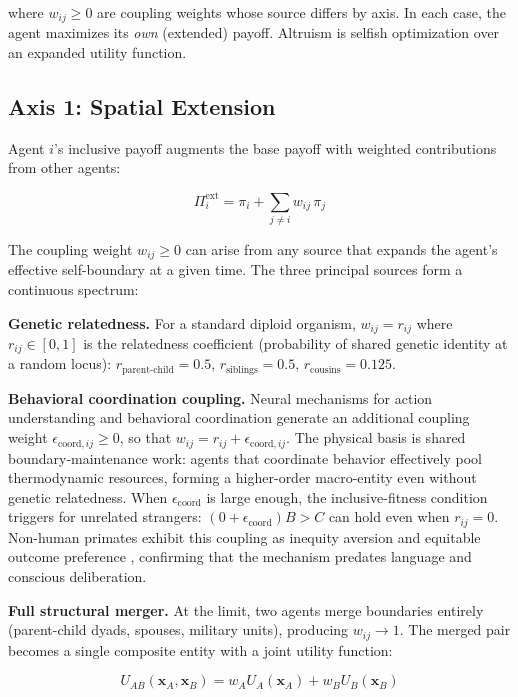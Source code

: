 \documentclass[11pt]{article}
\theoremstyle{plain}
\theoremstyle{definition}
\theoremstyle{remark}
\let\origsubsection\subsection
\renewcommand{\subsection}{\needspace{7\baselineskip}\origsubsection}
\begin{document}
where \(w_{ij} \geq 0\) are coupling weights whose source differs by
axis. In each case, the agent maximizes its \emph{own} (extended)
payoff. Altruism is selfish optimization over an expanded utility
function.

\subsection{Axis 1: Spatial Extension}\label{axis-1-spatial-extension}

Agent \(i\)'s inclusive payoff augments the base payoff with weighted
contributions from other agents:

\[\Pi_i^{\text{ext}} = \pi_i + \sum_{j \neq i} w_{ij} \, \pi_j\]

The coupling weight \(w_{ij} \geq 0\) can arise from any source that
expands the agent's effective self-boundary at a given time. The three
principal sources form a continuous spectrum:

\textbf{Genetic relatedness.} For a standard diploid organism,
\(w_{ij} = r_{ij}\) where \(r_{ij} \in [0, 1]\) is the relatedness
coefficient (probability of shared genetic identity at a random locus):
\(r_{\text{parent-child}} = 0.5\), \(r_{\text{siblings}} = 0.5\),
\(r_{\text{cousins}} = 0.125\).

\textbf{Behavioral coordination coupling.} Neural mechanisms for action
understanding and behavioral coordination
\citep{Rizzolatti2004, deWaal2008} generate an additional coupling
weight \(\epsilon_{\text{coord},ij} \geq 0\), so that
\(w_{ij} = r_{ij} + \epsilon_{\text{coord},ij}\). The physical basis is
shared boundary-maintenance work: agents that coordinate behavior
effectively pool thermodynamic resources, forming a higher-order
macro-entity even without genetic relatedness. When
\(\epsilon_{\text{coord}}\) is large enough, the inclusive-fitness
condition triggers for unrelated strangers:
\((0 + \epsilon_{\text{coord}}) B > C\) can hold even when
\(r_{ij} = 0\). Non-human primates exhibit this coupling as inequity
aversion \citep{BrosnanDeWaal2003} and equitable outcome preference
\citep{ProctorEtAl2013}, confirming that the mechanism predates language
and conscious deliberation.

\textbf{Full structural merger.} At the limit, two agents merge
boundaries entirely (parent-child dyads, spouses, military units),
producing \(w_{ij} \to 1\). The merged pair becomes a single composite
entity with a joint utility function:

\[U_{AB}(\mathbf{x}_A, \mathbf{x}_B) = w_A U_A(\mathbf{x}_A) + w_B U_B(\mathbf{x}_B)\]
\end{document}
